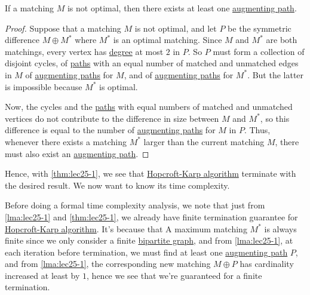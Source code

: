 \begin{theorem}\label{thm:lec25-1}
	If a matching \(M\) is not optimal, then there exists at least one \hyperref[def:augmenting-path]{augmenting path}.
\end{theorem}
\begin{proof}
	Suppose that a matching \(M\) is not optimal, and let \(P\) be the symmetric difference \(M\oplus M^{\ast} \) where \(M^{\ast} \) is an optimal matching. Since \(M\) and \(M^{\ast} \) are both matchings, every vertex has \hyperref[def:degree]{degree} at most \(2\) in \(P\). So \(P\) must form a collection of disjoint cycles, of \hyperref[def:path]{paths} with an equal number of matched and unmatched edges in \(M\) of \hyperref[def:augmenting-path]{augmenting paths} for \(M\), and of \hyperref[def:augmenting-path]{augmenting paths} for \(M^{\ast} \). But the latter is impossible because \(M^{\ast} \) is optimal.

	Now, the cycles and the \hyperref[def:path]{paths} with equal numbers of matched and unmatched vertices do not contribute to the difference in size between \(M\) and \(M^{\ast} \), so this difference is equal to the number of \hyperref[def:augmenting-path]{augmenting paths} for \(M\) in \(P\). Thus, whenever there exists a matching \(M^{\ast} \) larger than the current matching \(M\), there must also exist an \hyperref[def:augmenting-path]{augmenting path}.
\end{proof}

Hence, with \autoref{thm:lec25-1}, we see that \hyperref[algo:Hopcroft-Karp-algorithm]{Hopcroft-Karp algorithm} terminate with the desired
result. We now want to know its time complexity.
\begin{remark}
	Before doing a formal time complexity analysis, we note that just from \autoref{lma:lec25-1} and \autoref{thm:lec25-1}, we already have finite termination guarantee for \hyperref[algo:Hopcroft-Karp-algorithm]{Hopcroft-Karp algorithm}. It's because that A maximum matching \(M^{\ast} \) is always finite since we only consider a finite \href{https://en.wikipedia.org/wiki/Bipartite_graph}{bipartite graph}, and from \autoref{lma:lec25-1}, at each iteration before termination, we must find at least one \hyperref[def:augmenting-path]{augmenting path} \(P\), and from \autoref{lma:lec25-1}, the corresponding new matching \(M\oplus P\) has cardinality increased at least by \(1\), hence we see that we're guaranteed for a finite termination.
\end{remark}

